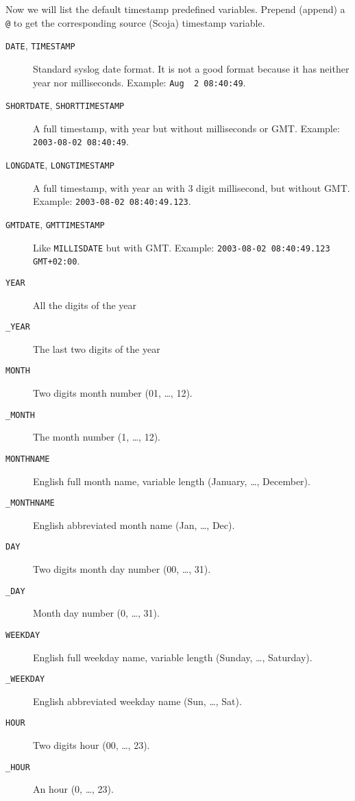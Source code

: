 Now we will list the default timestamp predefined variables.
Prepend (append) a \verb|@| to get the corresponding
source (Scoja) timestamp variable.
\begin{description}
  \item[{\tt DATE}, {\tt TIMESTAMP}]
    Standard syslog date format.
    It is not a good format because it has neither year nor
    milliseconds.
    Example: \verb*|Aug  2 08:40:49|.
  \item[{\tt SHORTDATE}, {\tt SHORTTIMESTAMP}]
    A full timestamp, with year but without milliseconds or GMT.
    Example: \verb*|2003-08-02 08:40:49|.
  \item[{\tt LONGDATE}, {\tt LONGTIMESTAMP}]
    A full timestamp, with year an with 3 digit millisecond, but
    without GMT.
    Example: \verb*|2003-08-02 08:40:49.123|.
  \item[{\tt GMTDATE}, {\tt GMTTIMESTAMP}]
    Like {\tt MILLISDATE} but with GMT. 
    Example: \verb*|2003-08-02 08:40:49.123 GMT+02:00|.   
    
  \item[{\tt YEAR}]
    All the digits of the year
  \item[{\tt \_YEAR}]
    The last two digits of the year
    
  \item[{\tt MONTH}]
    Two digits month number (01, \ldots, 12).
  \item[{\tt \_MONTH}]
    The month number (1, \ldots, 12).
  \item[{\tt MONTHNAME}]
    English full month name, variable length (January, \dots,
    December).
  \item[{\tt \_MONTHNAME}]
    English abbreviated month name (Jan, \dots, Dec).
    
  \item[{\tt DAY}]
    Two digits month day number (00, \ldots, 31).
  \item[{\tt \_DAY}]
    Month day number (0, \ldots, 31).
  
  \item[{\tt WEEKDAY}]
    English full weekday name, variable length (Sunday, \dots,
    Saturday).
  \item[{\tt \_WEEKDAY}]
    English abbreviated weekday name (Sun, \dots, Sat).
    
  \item[{\tt HOUR}]
    Two digits hour (00, \dots, 23).
  \item[{\tt \_HOUR}]
    An hour (0, \dots, 23).
    

\end{description}
